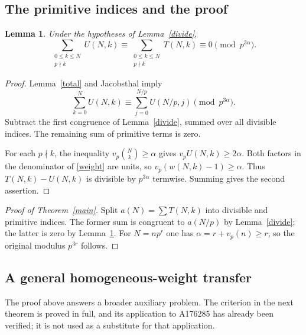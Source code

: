 \documentclass[11pt,a4paper]{article}
\newtheorem{lemma}[theorem]{Lemma}
\newcommand{\vp}{v_p}
\numberwithin{equation}{section}
\begin{document}
\subsection{The primitive indices and the proof}
\begin{lemma}\label{primitive}
Under the hypotheses of Lemma~\ref{divide},
\[
 \sum_{\substack{0\le k\le N\\p\nmid k}}U(N,k)
 \equiv
 \sum_{\substack{0\le k\le N\\p\nmid k}}T(N,k)
 \equiv0\pmod{p^{3\alpha}}.
\]
\end{lemma}
\begin{proof}
Lemma~\ref{total} and Jacobsthal imply
\[
 \sum_{k=0}^NU(N,k)
 \equiv\sum_{j=0}^{N/p}U(N/p,j)\pmod{p^{3\alpha}}.
\]
Subtract the first congruence of Lemma~\ref{divide}, summed over
all divisible indices. The remaining sum of primitive terms is zero.

For each $p\nmid k$, the inequality
$\vp\binom Nk\ge\alpha$ gives $\vp U(N,k)\ge2\alpha$.
Both factors in the denominator of \eqref{weight} are units, so
$\vp(w(N,k)-1)\ge\alpha$. Thus $T(N,k)-U(N,k)$ is divisible
by $p^{3\alpha}$ termwise. Summing gives the second assertion.
\end{proof}

\begin{proof}[Proof of Theorem~\ref{main}]
Split $a(N)=\sum T(N,k)$ into divisible and primitive indices.
The former sum is congruent to $a(N/p)$ by Lemma~\ref{divide};
the latter is zero by Lemma~\ref{primitive}. For $N=np^r$ one has
$\alpha=r+\vp(n)\ge r$, so the original modulus $p^{3r}$ follows.
\end{proof}


\subsection{A general homogeneous-weight transfer}\label{sec:general-weight}
The proof above answers a broader auxiliary problem. The criterion in
the next theorem is proved in full, and its application to A176285 has
already been verified; it is not used as a substitute for that application.
\end{document}
